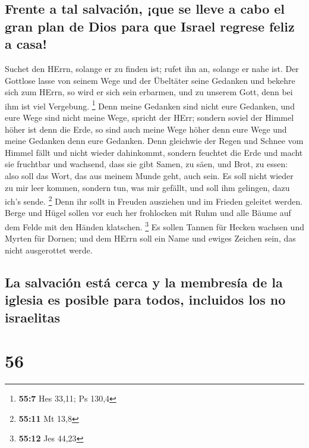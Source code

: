 \hypertarget{frente-a-tal-salvaciuxf3n-que-se-lleve-a-cabo-el-gran-plan-de-dios-para-que-israel-regrese-feliz-a-casa}{%
\subsection{Frente a tal salvación, ¡que se lleve a cabo el gran plan de
Dios para que Israel regrese feliz a
casa!}\label{frente-a-tal-salvaciuxf3n-que-se-lleve-a-cabo-el-gran-plan-de-dios-para-que-israel-regrese-feliz-a-casa}}

 Suchet den HErrn, solange er zu finden ist; rufet ihn an,
solange er nahe ist.  Der Gottlose lasse von seinem Wege
und der Übeltäter seine Gedanken und bekehre sich zum HErrn, so wird er
sich sein erbarmen, und zu unserem Gott, denn bei ihm ist viel
Vergebung. \footnote{\textbf{55:7} Hes 33,11; Ps 130,4} 
Denn meine Gedanken sind nicht eure Gedanken, und eure Wege sind nicht
meine Wege, spricht der HErr;  sondern soviel der Himmel
höher ist denn die Erde, so sind auch meine Wege höher denn eure Wege
und meine Gedanken denn eure Gedanken.  Denn gleichwie
der Regen und Schnee vom Himmel fällt und nicht wieder dahinkommt,
sondern feuchtet die Erde und macht sie fruchtbar und wachsend, dass sie
gibt Samen, zu säen, und Brot, zu essen:  also soll das
Wort, das aus meinem Munde geht, auch sein. Es soll nicht wieder zu mir
leer kommen, sondern tun, was mir gefällt, und soll ihm gelingen, dazu
ich's sende. \footnote{\textbf{55:11} Mt 13,8}  Denn ihr
sollt in Freuden ausziehen und im Frieden geleitet werden. Berge und
Hügel sollen vor euch her frohlocken mit Ruhm und alle Bäume auf dem
Felde mit den Händen klatschen. \footnote{\textbf{55:12} Jes 44,23}
 Es sollen Tannen für Hecken wachsen und Myrten für
Dornen; und dem HErrn soll ein Name und ewiges Zeichen sein, das nicht
ausgerottet werde.

\hypertarget{la-salvaciuxf3n-estuxe1-cerca-y-la-membresuxeda-de-la-iglesia-es-posible-para-todos-incluidos-los-no-israelitas}{%
\subsection{La salvación está cerca y la membresía de la iglesia es
posible para todos, incluidos los no
israelitas}\label{la-salvaciuxf3n-estuxe1-cerca-y-la-membresuxeda-de-la-iglesia-es-posible-para-todos-incluidos-los-no-israelitas}}

\hypertarget{section-55}{%
\section{56}\label{section-55}}

